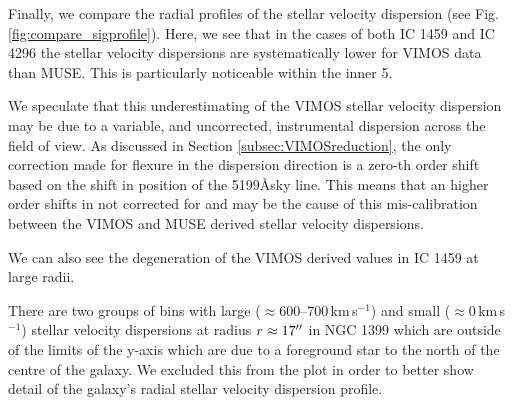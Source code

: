 			Finally, we compare the radial profiles of the stellar velocity dispersion (see Fig.\,\ref{fig:compare_sigprofile}). Here, we see that in the cases of both IC 1459 and IC 4296 the stellar velocity dispersions are systematically lower for VIMOS data than MUSE. This is particularly noticeable within the inner 5\arcsec. 

			We speculate that this underestimating of the VIMOS stellar velocity dispersion may be due to a variable, and uncorrected, instrumental dispersion across the field of view. As discussed in Section \ref{subsec:VIMOSreduction}, the only correction made for flexure in the dispersion direction is a zero-th order shift based on the shift in position of the 5199\AA sky line. This means that an higher order shifts in not corrected for and may be the cause of this mis-calibration between the VIMOS and MUSE derived stellar velocity dispersions.


			We can also see the degeneration of the VIMOS derived values in IC 1459 at large radii. 

			There are two groups of bins with large ($\approx$600--700\,km\,s$^{-1}$) and small ($\approx 0$\,km\,s$^{-1}$) stellar velocity dispersions at radius $r \approx 17\hbox{$^{\prime\prime}$}$ in NGC 1399 which are outside of the limits of the y-axis which are due to a foreground star to the north of the centre of the galaxy. We excluded this from the plot in order to better show detail of the galaxy's radial stellar velocity dispersion profile.


